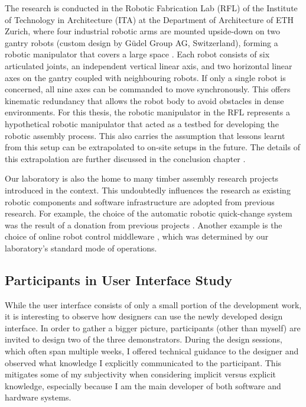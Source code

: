 The research is conducted in the Robotic Fabrication Lab (RFL) of the Institute of Technology in Architecture (ITA) at the Department of Architecture of ETH Zurich, where four industrial robotic arms are mounted upside-down on two gantry robots (custom design by Güdel Group AG, Switzerland), forming a robotic manipulator that covers a large space . Each robot consists of six articulated joints, an independent vertical linear axis, and two horizontal linear axes on the gantry coupled with neighbouring robots. If only a single robot is concerned, all nine axes can be commanded to move synchronously. This offers kinematic redundancy that allows the robot body to avoid obstacles in dense environments. For this thesis, the robotic manipulator in the RFL represents a hypothetical robotic manipulator that acted as a testbed for developing the robotic assembly process. This also carries the assumption that lessons learnt from this setup can be extrapolated to on-site setups in the future. The details of this extrapolation are further discussed in the conclusion chapter . 

Our laboratory is also the home to many timber assembly research projects introduced in the context. This undoubtedly influences the research as existing robotic components and software infrastructure are adopted from previous research. For example, the choice of the automatic robotic quick-change system was the result of a donation from previous projects . Another example is the choice of online robot control middleware , which was determined by our laboratory's standard mode of operations.

\subsection{Participants in User Interface Study}
\label{subsection:methodology_participants_in_user_interface_study}

While the user interface consists of only a small portion of the development work, it is interesting to observe how designers can use the newly developed design interface. In order to gather a bigger picture, participants (other than myself) are invited to design two of the three demonstrators. During the design sessions, which often span multiple weeks, I offered technical guidance to the designer and observed what knowledge I explicitly communicated to the participant. This mitigates some of my subjectivity when considering implicit versus explicit knowledge, especially because I am the main developer of both software and hardware systems. 


